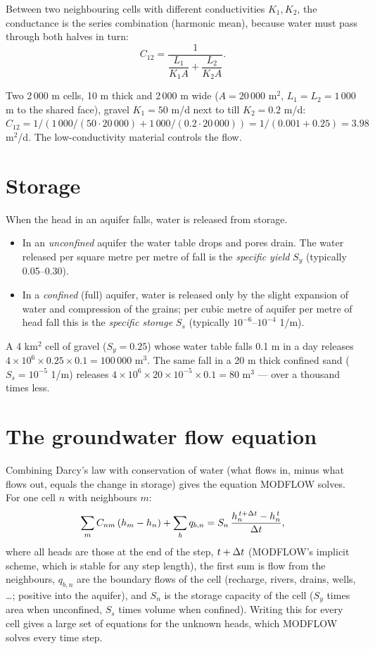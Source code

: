 Between two neighbouring cells with different conductivities $K_1,K_2$, the conductance is the series combination
(harmonic mean), because water must pass through both halves in turn:
\begin{equation}
C_{12}=\frac{1}{\dfrac{L_1}{K_1A}+\dfrac{L_2}{K_2A}} .
\end{equation}
\begin{example}
Two 2\,000 m cells, 10 m thick and 2\,000 m wide ($A=20\,000$ m$^2$, $L_1=L_2=1\,000$ m to the shared face), gravel
$K_1=50$ m/d next to till $K_2=0.2$ m/d:
$C_{12}=1/(1\,000/(50\cdot20\,000)+1\,000/(0.2\cdot20\,000)) = 1/(0.001+0.25)=3.98$ m$^2$/d. The low-conductivity
material controls the flow.
\end{example}

\section{Storage}
When the head in an aquifer falls, water is released from storage.
\begin{itemize}
\item In an \emph{unconfined} aquifer the water table drops and pores drain. The water released per square metre per
metre of fall is the \emph{specific yield} $S_y$ (typically 0.05--0.30).
\item In a \emph{confined} (full) aquifer, water is released only by the slight expansion of water and compression of
the grains; per cubic metre of aquifer per metre of head fall this is the \emph{specific storage} $S_s$
(typically $10^{-6}$--$10^{-4}$ 1/m).
\end{itemize}
\begin{example}
A 4 km$^2$ cell of gravel ($S_y=0.25$) whose water table falls 0.1 m in a day releases
$4\times10^6\times0.25\times0.1=100\,000$ m$^3$. The same fall in a 20 m thick confined sand ($S_s=10^{-5}$ 1/m)
releases $4\times10^6\times20\times10^{-5}\times0.1=80$ m$^3$ --- over a thousand times less.
\end{example}

\section{The groundwater flow equation}
Combining Darcy's law with conservation of water (what flows in, minus what flows out, equals the change in storage)
gives the equation MODFLOW solves. For one cell $n$ with neighbours $m$:
\begin{equation}
\sum_{m}C_{nm}\left(h_m-h_n\right) + \sum_{b}q_{b,n} = S_n\,\frac{h_n^{\,t+\Delta t}-h_n^{\,t}}{\Delta t},
\end{equation}
where all heads are those at the end of the step, $t+\Delta t$ (MODFLOW's implicit scheme, which is stable for any step
length), the first sum is flow from the neighbours, $q_{b,n}$ are the boundary flows of the cell (recharge, rivers,
drains, wells, \dots; positive into the aquifer), and $S_n$ is the storage capacity of the cell ($S_y$ times area when
unconfined, $S_s$ times volume when confined). Writing this for every cell gives a large set of equations for the
unknown heads, which MODFLOW solves every time step.

